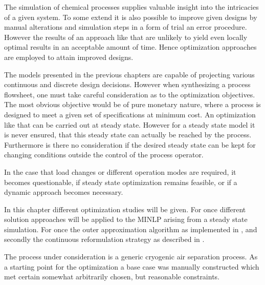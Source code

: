 The simulation of chemical processes supplies valuable insight into the intricacies of a given system.
To some extend it is also possible to improve given designs by manual alterations and simulation
steps in a form of trial an error procedure. However the results of an approach like that are unlikely
to yield even locally optimal results in an acceptable amount of time. Hence optimization approaches
are employed to attain improved designs.

The models presented in the previous chapters are capable of projecting various continuous and
discrete design decisions. However when synthesizing a process flowsheet, one must take careful
consideration as to the optimization objectives. The most obvious objective would be of
pure monetary nature, where a process is designed to meet a given set of specifications
at minimum cost. An optimization like that can be carried out at steady state. However for
a steady state model it is never ensured, that this steady state can actually be reached
by the process. Furthermore is there no consideration if the desired steady state can be kept for
changing conditions outside the control of the process operator.

In the case that load changes or different operation modes are required, it becomes questionable,
if steady state optimization remains feasible, or if a dynamic approach becomes necessary.

In this chapter different optimization studies will be given. For once different solution approaches
will be applied to the MINLP arising from a steady state simulation. For once the outer approximation
algorithm as implemented in \gproms, and secondly the continuous reformulation strategy as described
in .

The process under consideration is a generic cryogenic air separation process. As a starting point for the
optimization a base case was manually constructed which met certain somewhat arbitrarily chosen,
but reasonable constraints.

